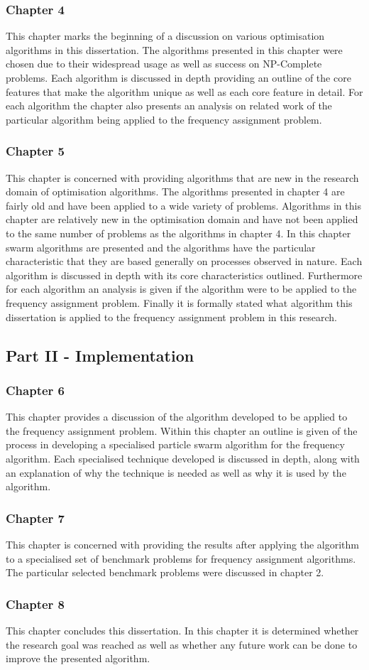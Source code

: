 \subsubsection{Chapter 4}
This chapter marks the beginning of a discussion on various optimisation algorithms in this dissertation. The algorithms presented in this chapter were chosen due to their widespread usage as well as success on NP-Complete problems. Each algorithm is discussed in depth providing an outline of the core features that make the algorithm unique as well as each core feature in detail. For each algorithm the chapter also presents an analysis on related work of the particular algorithm being applied to the frequency assignment problem. 
\subsubsection{Chapter 5}
This chapter is concerned with providing algorithms that are new in the research domain of optimisation algorithms. The algorithms presented in chapter 4 are fairly old and have been applied to a wide variety of problems. Algorithms in this chapter are relatively new in the optimisation domain and have not been applied to the same number of problems as the algorithms in chapter 4. In this chapter swarm algorithms are presented and the algorithms have the particular characteristic that they are based generally on processes observed in nature. Each algorithm is discussed in depth with its core characteristics outlined. Furthermore for each algorithm an analysis is given if the algorithm were to be applied to the frequency assignment problem. Finally it is formally stated what algorithm this dissertation is applied to the frequency assignment problem in this research.
\subsection{Part II - Implementation}
\subsubsection{Chapter 6}
This chapter provides a discussion of the algorithm developed to be applied to the frequency assignment problem. Within this chapter an outline is given of the process in developing a specialised particle swarm algorithm for the frequency algorithm. Each specialised technique developed is discussed in depth, along with an explanation of why the technique is needed as well as why it is used by the algorithm.
\subsubsection{Chapter 7}
This chapter is concerned with providing the results after applying the algorithm to a specialised set of benchmark problems for frequency assignment algorithms. The particular selected benchmark problems were discussed in chapter 2.
\subsubsection{Chapter 8}
This chapter concludes this dissertation. In this chapter it is determined whether the research goal was reached as well as whether any future work can be done to improve the presented algorithm.
